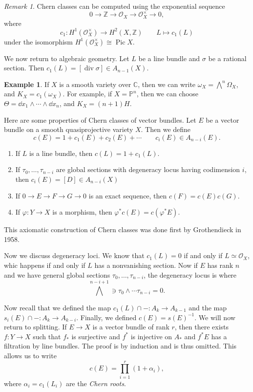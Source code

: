 \documentclass[leqno, openany]{memoir}
\theoremstyle{definition}
\newtheorem{exm}[thm]{Example}
\theoremstyle{remark}
\newtheorem{rmk}[thm]{Remark}
\theoremstyle{plain}
\theoremstyle{definition}
\theoremstyle{remark}
\newcommand{\C}{\mathbb{C}}
\newcommand{\Z}{\mathbb{Z}}
\renewcommand{\P}{\mathbb{P}}
\newcommand{\mc}[1]{\mathcal{#1}}
\renewcommand{\div}{\operatorname{div}}
\DeclareMathOperator{\Pic}{Pic}
\begin{document}
\begin{rmk}
    Chern classes can be computed using the exponential sequence 
    \[ 0 \to \Z \to \mc{O}_X \to \mc{O}_X^{\times} \to 0, \] 
    where
    \[ c_1 \colon H^1(\mc{O}_X^{\times}) \to H^2(X, \Z) \qquad L \mapsto c_1(L) \]
    under the isomorphism $H^1(\mc{O}_X^{\times}) \cong \Pic X$.
\end{rmk}

We now return to algebraic geometry. Let $L$ be a line bundle and $\sigma$ be a rational section. Then $c_1(L) = [\div \sigma] \in A_{n-1}(X)$.

\begin{exm}
    If $X$ is a smooth variety over $\C$, then we can write $\omega_X = \bigwedge^n \Omega_X$, and $K_X = c_1(\omega_X)$. For example, if $X = \P^n$, then we can choose $\Theta = \dd{x_1} \wedge \cdots \wedge \dd{x_n}$, and $K_X = (n+1)H$.
\end{exm}

Here are some properties of Chern classes of vector bundles. Let $E$ be a vector bundle on a smooth quasiprojective variety $X$. Then we define
\[ c(E) = 1 + c_1(E) + c_2(E) + \cdots \qquad c_i(E) \in A_{n-i}(E). \]
\begin{enumerate}
    \item If $L$ is a line bundle, then $c(L) = 1 + c_1(L)$.
    \item If $\tau_0, \ldots, \tau_{n-i}$ are global sections with degeneracy locus having codimension $i$, then $c_i(E) = [D] \in A_{n-i}(X)$
    \item If $0 \to E \to F \to G \to 0$ is an exact sequence, then $c(F) = c(E) c(G)$.
    \item If $\varphi \colon Y \to X$ is a morphism, then $\varphi^* c(E) = c(\varphi^* E)$.
\end{enumerate}
This axiomatic construction of Chern classes was done first by Grothendieck in 1958.

Now we discuss degeneracy loci. We know that $c_1(L) = 0$ if and only if $L \simeq \mc{O}_X$, whic happens if and only if $L$ has a nonvanishing section. Now if $E$ has rank $n$ and we have general global sections $\tau_0, \ldots, \tau_{n-i}$, the degeneracy locus is where
\[ {\bigwedge}^{n-i+1} \ni \tau_0 \wedge \cdots \tau_{n-i} = 0. \]

Now recall that we defined the map $c_1(L) \cap - \colon A_k \to A_{k-1}$ and the map $s_i(E) \cap - \colon A_k \to A_{k-i}$. Finally, we defined $c(E) = {s(E)}^{-1}$. We will now return to splitting. If $E \to X$ is a vector bundle of rank $r$, then there exists $f \colon Y \to X$ such that $f_*$ is surjective and $f^*$ is injective on $A_*$ and $f^* E$ has a filtration by line bundles. The proof is by induction and is thus omitted. This allows us to write 
\[ c(E) = \prod_{i=1}^r (1 + \alpha_i), \]
where $\alpha_i = c_1(L_i)$ are the \textit{Chern roots}.
\end{document}
